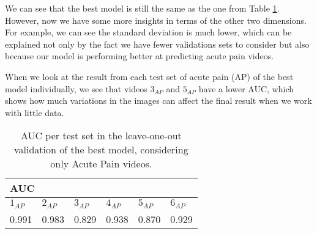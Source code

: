 We can see that the best model is still the same as the one from Table \ref{tab:auc_leave_one_out}. However, now we have some more insights in terms of the other two dimensions. For example, we can see the standard deviation is much lower, which can be explained not only by the fact we have fewer validations sets to consider but also because our model is performing better at predicting acute pain videos.

When we look at the result from each test set of acute pain (AP) of the best model individually, we see that videos $3_{AP}$ and $5_{AP}$ have a lower AUC, which shows how much variations in the images can affect the final result when we work with little data. 

\begin{table}[h!tp]
\setlength{\tabcolsep}{3.41pt}
\centering
\caption{AUC per test set in the leave-one-out validation of the best model, considering only Acute Pain videos.}
\label{tab:auc_leave_one_out}
\begin{tabular}{llllll}
\hline
\multicolumn{6}{l}{AUC} \\ \hline
\multicolumn{1}{l|}{$1_{AP}$}    & \multicolumn{1}{l|}{$2_{AP}$}    & \multicolumn{1}{l|}{$3_{AP}$}    & \multicolumn{1}{l|}{$4_{AP}$}    & \multicolumn{1}{l|}{$5_{AP}$}    & $6_{AP}$   \\ \hline
\multicolumn{1}{l|}{0.991} & \multicolumn{1}{l|}{0.983} & \multicolumn{1}{l|}{0.829} & \multicolumn{1}{l|}{0.938} & \multicolumn{1}{l|}{0.870} & 0.929 \\ \hline
\end{tabular}
\end{table}
